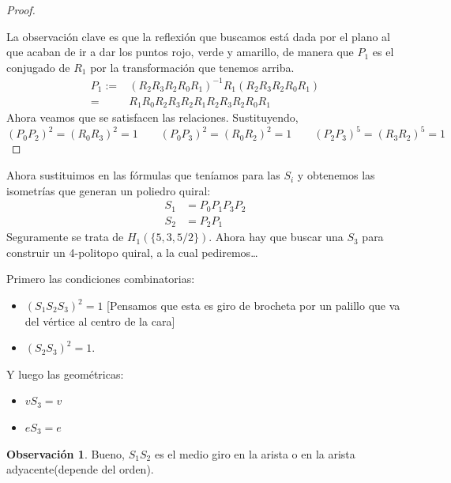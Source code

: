 \documentclass[spanish]{article}
\theoremstyle{definition}
\newtheorem*{obs}{Observación}
\begin{document}
\begin{proof}
\begin{figure}[H]
\begin{subfigure}{0.4\linewidth}
			\end{subfigure}
		\end{figure}
		La observación clave es que la reflexión que buscamos está dada por el plano al que acaban de ir a dar los puntos rojo, verde y amarillo, de manera que $P_1$ es el conjugado de $R_1$ por la transformación que tenemos arriba.
		\begin{align*}
			P_1:=&(R_2R_3R_2R_0R_1)^{-1}R_1(R_2R_3R_2R_0R_1)\\
			=&R_1R_0R_2R_3R_2R_1R_2R_3R_2R_0R_1
		\end{align*}
		Ahora veamos que se satisfacen las relaciones. Sustituyendo,
		\[(P_0P_2)^2=(R_0R_3)^2=1\qquad (P_0P_3)^2=(R_0R_2)^2=1\qquad (P_2P_3)^5=(R_3R_2)^5=1\]
	\end{proof}
	Ahora sustituimos en las fórmulas que teníamos para las $S_i$ y obtenemos las isometrías que generan un poliedro quiral:
	\begin{align*}
		S_1&=P_0P_1P_3P_2\\
		S_2&=P_2P_1
	\end{align*}
	Seguramente se trata de $H_1(\{5,3,5/2\})$. Ahora hay que buscar una $S_3$ para construir un 4-politopo quiral, a la cual pediremos…
	
	Primero las condiciones combinatorias:
	\begin{itemize}
		\item $(S_1S_2S_3)^2=1$ [Pensamos que esta es giro de brocheta por un palillo que va del vértice al centro de la cara]
		\item $(S_2S_3)^2=1$.
	\end{itemize}
	Y luego las geométricas:
	\begin{itemize}
		\item $vS_3=v$
		\item $eS_3=e$
	\end{itemize}
	
	
	\begin{obs}
		Bueno, $S_1S_2$ es el medio giro en la arista o en la arista adyacente(depende del orden).
	\end{obs}
	
\end{document}
